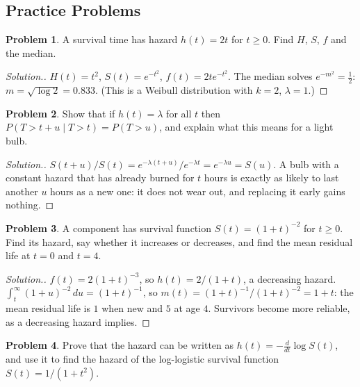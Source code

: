 \documentclass[11pt,a4paper]{article}
\numberwithin{equation}{section}
\theoremstyle{definition}
\newtheorem{problemx}{Problem}[subsection]
\newenvironment{problem}{\begin{problemx}}{\end{problemx}}
\newenvironment{solution}
  {\renewcommand{\qedsymbol}{}\begin{proof}[\textit{Solution}.]}
  {\end{proof}}
\begin{document}
\subsection{Practice Problems}

\begin{problem}
A survival time has hazard $h(t) = 2t$ for $t \geq 0$. Find $H$, $S$, $f$ and the median.
\end{problem}

\begin{solution}
$H(t) = t^2$, $S(t) = e^{-t^2}$, $f(t) = 2te^{-t^2}$. The median solves $e^{-m^2} = \frac12$: $m = \sqrt{\log 2} = 0.833$. (This is a Weibull distribution with $k = 2$, $\lambda = 1$.)
\end{solution}

\begin{problem}
Show that if $h(t) = \lambda$ for all $t$ then $P(T > t + u \mid T > t) = P(T > u)$, and explain what this means for a light bulb.
\end{problem}

\begin{solution}
$S(t + u)/S(t) = e^{-\lambda(t + u)}/e^{-\lambda t} = e^{-\lambda u} = S(u)$. A bulb with a constant hazard that has already burned for $t$ hours is exactly as likely to last another $u$ hours as a new one: it does not wear out, and replacing it early gains nothing.
\end{solution}

\begin{problem}
A component has survival function $S(t) = (1 + t)^{-2}$ for $t \geq 0$. Find its hazard, say whether it increases or decreases, and find the mean residual life at $t = 0$ and $t = 4$.
\end{problem}

\begin{solution}
$f(t) = 2(1 + t)^{-3}$, so $h(t) = 2/(1 + t)$, a decreasing hazard. $\int_t^\infty(1 + u)^{-2}\,du = (1 + t)^{-1}$, so $m(t) = (1 + t)^{-1}/(1 + t)^{-2} = 1 + t$: the mean residual life is $1$ when new and $5$ at age $4$. Survivors become more reliable, as a decreasing hazard implies.
\end{solution}

\begin{problem}
Prove that the hazard can be written as $h(t) = -\frac{d}{dt}\log S(t)$, and use it to find the hazard of the log-logistic survival function $S(t) = 1/(1 + t^2)$.
\end{problem}
\end{document}
